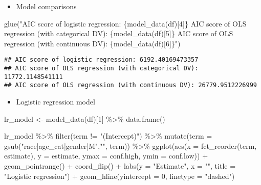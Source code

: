 \documentclass[
]{book}
\newenvironment{Shaded}{\begin{snugshade}}{\end{snugshade}}
\newcommand{\AttributeTok}[1]{\textcolor[rgb]{0.77,0.63,0.00}{#1}}
\newcommand{\DecValTok}[1]{\textcolor[rgb]{0.00,0.00,0.81}{#1}}
\newcommand{\FunctionTok}[1]{\textcolor[rgb]{0.00,0.00,0.00}{#1}}
\newcommand{\NormalTok}[1]{#1}
\newcommand{\OtherTok}[1]{\textcolor[rgb]{0.56,0.35,0.01}{#1}}
\newcommand{\SpecialCharTok}[1]{\textcolor[rgb]{0.00,0.00,0.00}{#1}}
\newcommand{\StringTok}[1]{\textcolor[rgb]{0.31,0.60,0.02}{#1}}
\providecommand{\tightlist}{%
  \setlength{\itemsep}{0pt}\setlength{\parskip}{0pt}}
\begin{document}
\begin{itemize}
\tightlist
\item
  Model comparisons
\end{itemize}

\begin{Shaded}
\begin{Highlighting}[]
\FunctionTok{glue}\NormalTok{(}\StringTok{"AIC score of logistic regression: \{model\_data(df)[4]\} }
\StringTok{      AIC score of OLS regression (with categorical DV):  \{model\_data(df)[5]\}}
\StringTok{      AIC score of OLS regression (with continuous DV): \{model\_data(df)[6]\}"}\NormalTok{)}
\end{Highlighting}
\end{Shaded}

\begin{verbatim}
## AIC score of logistic regression: 6192.40169473357 
## AIC score of OLS regression (with categorical DV):  11772.1148541111
## AIC score of OLS regression (with continuous DV): 26779.9512226999
\end{verbatim}

\begin{itemize}
\tightlist
\item
  Logistic regression model
\end{itemize}

\begin{Shaded}
\begin{Highlighting}[]
\NormalTok{lr\_model }\OtherTok{\textless{}{-}} \FunctionTok{model\_data}\NormalTok{(df)[}\DecValTok{1}\NormalTok{] }\SpecialCharTok{\%\textgreater{}\%} \FunctionTok{data.frame}\NormalTok{()}

\NormalTok{lr\_model }\SpecialCharTok{\%\textgreater{}\%}
  \FunctionTok{filter}\NormalTok{(term }\SpecialCharTok{!=} \StringTok{"(Intercept)"}\NormalTok{) }\SpecialCharTok{\%\textgreater{}\%}
  \FunctionTok{mutate}\NormalTok{(}\AttributeTok{term =} \FunctionTok{gsub}\NormalTok{(}\StringTok{"race|age\_cat|gender|M"}\NormalTok{,}\StringTok{""}\NormalTok{, term)) }\SpecialCharTok{\%\textgreater{}\%}
  \FunctionTok{ggplot}\NormalTok{(}\FunctionTok{aes}\NormalTok{(}\AttributeTok{x =} \FunctionTok{fct\_reorder}\NormalTok{(term, estimate), }\AttributeTok{y =}\NormalTok{ estimate, }\AttributeTok{ymax =}\NormalTok{ conf.high, }\AttributeTok{ymin =}\NormalTok{ conf.low)) }\SpecialCharTok{+}
  \FunctionTok{geom\_pointrange}\NormalTok{() }\SpecialCharTok{+}
  \FunctionTok{coord\_flip}\NormalTok{() }\SpecialCharTok{+}
  \FunctionTok{labs}\NormalTok{(}\AttributeTok{y =} \StringTok{"Estimate"}\NormalTok{, }\AttributeTok{x =} \StringTok{""}\NormalTok{,}
      \AttributeTok{title =} \StringTok{"Logistic regression"}\NormalTok{) }\SpecialCharTok{+}
  \FunctionTok{geom\_hline}\NormalTok{(}\AttributeTok{yintercept =} \DecValTok{0}\NormalTok{, }\AttributeTok{linetype =} \StringTok{"dashed"}\NormalTok{)}
\end{Highlighting}
\end{Shaded}
\end{document}
